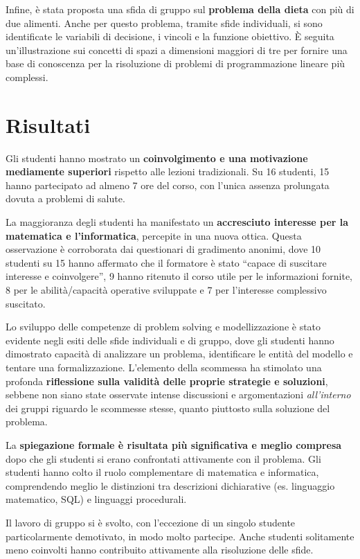 \documentclass[withtimes]{easychair}
\begin{document}
Infine, è stata proposta una sfida di gruppo sul \textbf{problema della
dieta} con più di due alimenti. Anche per questo problema, tramite sfide
individuali, si sono identificate le variabili di decisione, i vincoli e
la funzione obiettivo. È seguita un'illustrazione sui concetti di spazi
a dimensioni maggiori di tre per fornire una base di conoscenza per la
risoluzione di problemi di programmazione lineare più complessi.

\section{Risultati}\label{risultati}

Gli studenti hanno mostrato un \textbf{coinvolgimento e una motivazione
mediamente superiori} rispetto alle lezioni tradizionali. Su 16
studenti, 15 hanno partecipato ad almeno 7 ore del corso, con l'unica
assenza prolungata dovuta a problemi di salute.

La maggioranza degli studenti ha manifestato un \textbf{accresciuto
interesse per la matematica e l'informatica}, percepite in una nuova
ottica. Questa osservazione è corroborata dai questionari di gradimento
anonimi, dove 10 studenti su 15 hanno affermato che il formatore è stato
``capace di suscitare interesse e coinvolgere'', 9 hanno ritenuto il
corso utile per le informazioni fornite, 8 per le abilità/capacità
operative sviluppate e 7 per l'interesse complessivo suscitato.

Lo sviluppo delle competenze di problem solving e modellizzazione è
stato evidente negli esiti delle sfide individuali e di gruppo, dove gli
studenti hanno dimostrato capacità di analizzare un problema,
identificare le entità del modello e tentare una formalizzazione.
L'elemento della scommessa ha stimolato una profonda \textbf{riflessione
sulla validità delle proprie strategie e soluzioni}, sebbene non siano
state osservate intense discussioni e argomentazioni \emph{all'interno}
dei gruppi riguardo le scommesse stesse, quanto piuttosto sulla
soluzione del problema.

La \textbf{spiegazione formale è risultata più significativa e meglio
compresa} dopo che gli studenti si erano confrontati attivamente con il
problema. Gli studenti hanno colto il ruolo complementare di matematica
e informatica, comprendendo meglio le distinzioni tra descrizioni
dichiarative (es. linguaggio matematico, SQL) e linguaggi procedurali.

Il lavoro di gruppo si è svolto, con l'eccezione di un singolo studente
particolarmente demotivato, in modo molto partecipe. Anche studenti
solitamente meno coinvolti hanno contribuito attivamente alla
risoluzione delle sfide.
\end{document}
